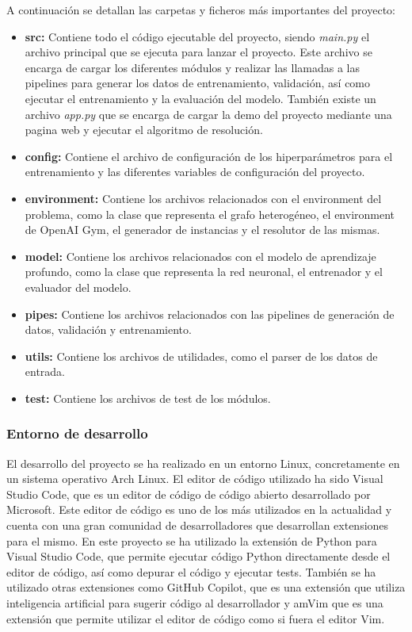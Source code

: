 A continuación se detallan las carpetas y ficheros más importantes del proyecto:
\begin{itemize}
    \item \textbf{src: } Contiene todo el código ejecutable del proyecto, siendo \textit{main.py} el archivo 
    principal que se ejecuta para lanzar el proyecto. Este archivo se encarga de cargar los
    diferentes módulos y realizar las llamadas a las pipelines para generar los datos de entrenamiento,
    validación, así como ejecutar el entrenamiento y la evaluación del modelo. También existe un archivo
    \textit{app.py} que se encarga de cargar la demo del proyecto mediante una pagina web y ejecutar el 
    algoritmo de resolución.
    \item \textbf{config: } Contiene el archivo de configuración de los hiperparámetros para el entrenamiento 
    y las diferentes variables de configuración del proyecto.
    \item \textbf{environment: } Contiene los archivos relacionados con el environment del problema, como la
    clase que representa el grafo heterogéneo, el environment de OpenAI Gym, el generador de instancias y 
    el resolutor de las mismas.
    \item \textbf{model: } Contiene los archivos relacionados con el modelo de aprendizaje profundo, como la
    clase que representa la red neuronal, el entrenador y el evaluador del modelo.
    \item \textbf{pipes: } Contiene los archivos relacionados con las pipelines de generación de datos,
    validación y entrenamiento. 
    \item \textbf{utils: } Contiene los archivos de utilidades, como el parser de los datos de entrada.
    \item \textbf{test: } Contiene los archivos de test de los módulos.
\end{itemize}

\subsubsection{Entorno de desarrollo}
El desarrollo del proyecto se ha realizado en un entorno Linux, concretamente en un sistema operativo
Arch Linux. El editor de código utilizado ha sido Visual Studio Code, que es un editor de código
de código abierto desarrollado por Microsoft. Este editor de código es uno de los más utilizados
en la actualidad y cuenta con una gran comunidad de desarrolladores que desarrollan extensiones
para el mismo. En este proyecto se ha utilizado la extensión de Python para Visual Studio Code,
que permite ejecutar código Python directamente desde el editor de código, así como depurar el
código y ejecutar tests. También se ha utilizado otras extensiones como GitHub Copilot, que es
una extensión que utiliza inteligencia artificial para sugerir código al desarrollador y amVim
que es una extensión que permite utilizar el editor de código como si fuera el editor Vim.

